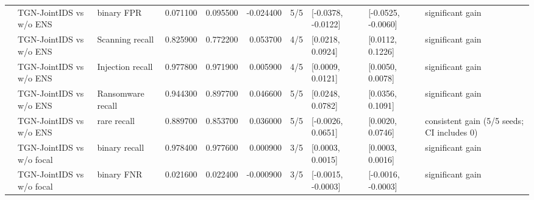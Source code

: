 \begin{table}
\begin{tabular}{lllrrrllll}
 & TGN-JointIDS vs w/o ENS & binary FPR & 0.071100 & 0.095500 & -0.024400 & 5/5 & [-0.0378, -0.0122] & [-0.0525, -0.0060] & significant gain \\
 & TGN-JointIDS vs w/o ENS & Scanning recall & 0.825900 & 0.772200 & 0.053700 & 4/5 & [0.0218, 0.0924] & [0.0112, 0.1226] & significant gain \\
 & TGN-JointIDS vs w/o ENS & Injection recall & 0.977800 & 0.971900 & 0.005900 & 4/5 & [0.0009, 0.0121] & [0.0050, 0.0078] & significant gain \\
 & TGN-JointIDS vs w/o ENS & Ransomware recall & 0.944300 & 0.897700 & 0.046600 & 5/5 & [0.0248, 0.0782] & [0.0356, 0.1091] & significant gain \\
 & TGN-JointIDS vs w/o ENS & rare recall & 0.889700 & 0.853700 & 0.036000 & 5/5 & [-0.0026, 0.0651] & [0.0020, 0.0746] & consistent gain (5/5 seeds; CI includes 0) \\
 & TGN-JointIDS vs w/o focal & binary recall & 0.978400 & 0.977600 & 0.000900 & 3/5 & [0.0003, 0.0015] & [0.0003, 0.0016] & significant gain \\
 & TGN-JointIDS vs w/o focal & binary FNR & 0.021600 & 0.022400 & -0.000900 & 3/5 & [-0.0015, -0.0003] & [-0.0016, -0.0003] & significant gain \\
\cline{1-10}
\bottomrule
\end{tabular}
\end{table}

